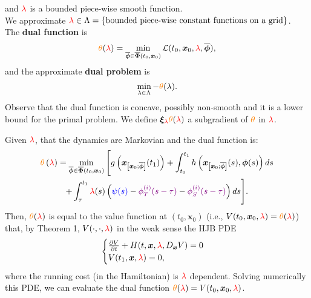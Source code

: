 \documentclass[ima, 20pt, portrait, plainboxedsections]{sciposter}
\begin{document}
\begin{multicols}{3}
and ${\color{red}\lambda}$ is a bounded piece-wise smooth function.\\
We approximate ${\color{red}\lambda}\in\Lambda=\{\text{bounded piece-wise constant functions on a grid}\}$.\\
The \textbf{dual function} is
\begin{equation*}
{\color{orange}\theta}({\color{red}\lambda})=\min_{\overline{\bm{\phi}}\in\overline{\bm{\Phi}}(t_0,\bm{x}_0)}\mathcal{L}(t_0,\bm{x}_0,{\color{red}\lambda},\overline{\bm{\phi}}),
\end{equation*}
and the approximate \textbf{dual problem} is
\begin{equation*}
\min_{\lambda\in\Lambda}-{\color{orange}\theta}(\lambda).
\end{equation*}
Observe that the dual function is concave, possibly non-smooth and it is a lower bound for the primal problem. We define $\bm{\xi}_{\color{red}\lambda}{\color{orange}\theta}({\color{red}\lambda})$ a subgradient of ${\color{orange}\theta}$ in ${\color{red}\lambda}$.

Given ${\color{red}\lambda}$, that the dynamics are Markovian and the dual function is:
\begin{multline*}
{\color{orange}\theta}\left({\color{red}\lambda}\right)=\min_{\overline{\bm{\phi}}\in\overline{\bm{\Phi}}(t_0,\bm{x}_0)}\Bigg[g\left(\bm{x}_{\left[\bm{x}_0;\overline{\bm{\phi}}\right]}(t_1)\right)+\int_{t_0}^{t_1}h\left(\bm{x}_{\left[\bm{x}_0;\overline{\bm{\phi}}\right]}(s),\bm{\phi}(s)\right)ds\\
+\int_{\tau}^{t_1}{\color{red}\lambda}(s)\left({\color{blue}\psi(s)}-{\color{violet}\phi_T^{(i)}(s-\tau)}-{\color{violet}\phi_S^{(i)}(s-\tau)}\right)ds\Bigg].
\end{multline*}
Then, ${\color{orange}\theta}({\color{red}\lambda})$ is equal to the value function at $(t_0,\bm{x}_0)$ (i.e., $V(t_0,\bm{x}_0,{\color{red}\lambda})={\color{orange}\theta}({\color{red}\lambda})$) that, by Theorem 1, $V(\cdot,\cdot,{\color{red}\lambda})$ in the weak sense the HJB PDE
\begin{equation*}
\begin{cases}
\frac{\partial V}{\partial t}+H(t,\bm{x},{\color{red}\lambda},D_{\bm{x}}V)=0\\
V(t_1,\bm{x},{\color{red}\lambda})=0,
\end{cases}
\end{equation*}
where the running cost (in the Hamiltonian) is ${\color{red}\lambda}$ dependent. Solving numerically this PDE, we can evaluate the dual function ${\color{orange}\theta}({\color{red}\lambda})=V(t_0,\bm{x}_0,{\color{red}\lambda})$.
 

\end{multicols}
\end{document}
